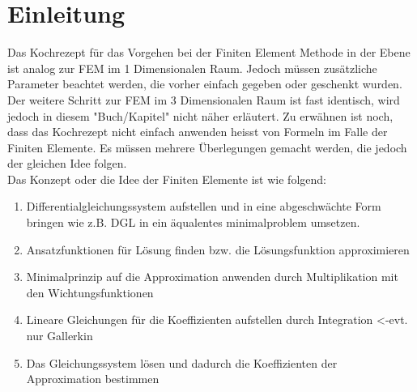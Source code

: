%
%
%
\section{Einleitung\label{fem:section:einleitung}}
Das Kochrezept für das Vorgehen bei der Finiten Element Methode in der Ebene ist analog zur FEM im 1 Dimensionalen Raum. Jedoch müssen zusätzliche Parameter beachtet werden, die vorher einfach gegeben oder geschenkt wurden. Der weitere Schritt zur FEM im 3 Dimensionalen Raum ist fast identisch, wird jedoch in diesem "Buch/Kapitel" nicht näher erläutert. Zu erwähnen ist noch, dass das Kochrezept nicht einfach anwenden heisst von Formeln im Falle der Finiten Elemente. Es müssen mehrere Überlegungen gemacht werden, die jedoch der gleichen Idee folgen.\\

Das Konzept oder die Idee der Finiten Elemente ist wie folgend:

\begin{enumerate}
	\item Differentialgleichungssystem aufstellen und in eine abgeschwächte Form bringen wie z.B. DGL in ein äqualentes minimalproblem umsetzen.
	\item Ansatzfunktionen für Lösung finden bzw. die Lösungsfunktion approximieren
	\item Minimalprinzip auf die Approximation anwenden durch Multiplikation mit den Wichtungsfunktionen
	\item Lineare Gleichungen für die Koeffizienten aufstellen durch Integration <-evt. nur Gallerkin
	\item Das Gleichungssystem lösen und dadurch die Koeffizienten der Approximation bestimmen
\end{enumerate}



